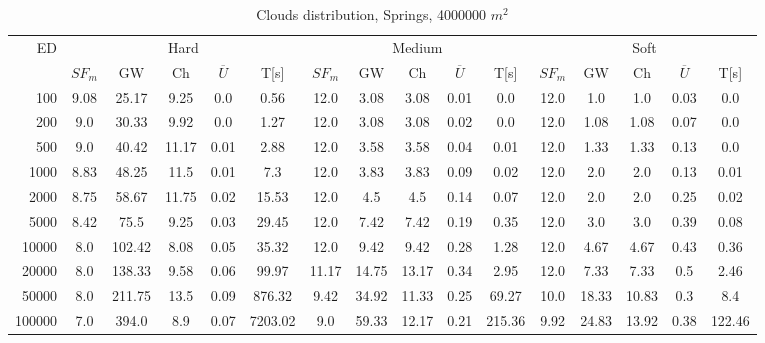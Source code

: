 \begin{table}[htb]
	\centering
	\footnotesize
	\begin{tabular}{|r|c|c|c|c|c|c|c|c|c|c|c|c|c|c|c|} 
		\hline
		\multirow{2}{*}{ED} & \multicolumn{5}{c|}{Hard} & \multicolumn{5}{c|}{Medium} &\multicolumn{5}{c|}{Soft} \\ 
		\cline{2-16} 
		&$SF_{m}$&GW & Ch & $\overline{U}$&T[s] &$SF_{m}$&GW & Ch & $\overline{U}$ &T[s] &$SF_{m}$&GW & Ch & $\overline{U}$  & T[s]  \\ 
		\hline 
		100 & 9.08 & 25.17 & 9.25 & 0.0 & 0.56 & 12.0 & 3.08 & 3.08 & 0.01 & 0.0 & 12.0 & 1.0 & 1.0 & 0.03 & 0.0\\ 
		200 & 9.0 & 30.33 & 9.92 & 0.0 & 1.27 & 12.0 & 3.08 & 3.08 & 0.02 & 0.0 & 12.0 & 1.08 & 1.08 & 0.07 & 0.0\\ 
		500 & 9.0 & 40.42 & 11.17 & 0.01 & 2.88 & 12.0 & 3.58 & 3.58 & 0.04 & 0.01 & 12.0 & 1.33 & 1.33 & 0.13 & 0.0\\ 
		1000 & 8.83 & 48.25 & 11.5 & 0.01 & 7.3 & 12.0 & 3.83 & 3.83 & 0.09 & 0.02 & 12.0 & 2.0 & 2.0 & 0.13 & 0.01\\ 
		2000 & 8.75 & 58.67 & 11.75 & 0.02 & 15.53 & 12.0 & 4.5 & 4.5 & 0.14 & 0.07 & 12.0 & 2.0 & 2.0 & 0.25 & 0.02\\ 
		5000 & 8.42 & 75.5 & 9.25 & 0.03 & 29.45 & 12.0 & 7.42 & 7.42 & 0.19 & 0.35 & 12.0 & 3.0 & 3.0 & 0.39 & 0.08\\ 
		10000 & 8.0 & 102.42 & 8.08 & 0.05 & 35.32 & 12.0 & 9.42 & 9.42 & 0.28 & 1.28 & 12.0 & 4.67 & 4.67 & 0.43 & 0.36\\ 
		20000 & 8.0 & 138.33 & 9.58 & 0.06 & 99.97 & 11.17 & 14.75 & 13.17 & 0.34 & 2.95 & 12.0 & 7.33 & 7.33 & 0.5 & 2.46\\ 
		50000 & 8.0 & 211.75 & 13.5 & 0.09 & 876.32 & 9.42 & 34.92 & 11.33 & 0.25 & 69.27 & 10.0 & 18.33 & 10.83 & 0.3 & 8.4\\ 
		100000 & 7.0 & 394.0 & 8.9 & 0.07 & 7203.02 & 9.0 & 59.33 & 12.17 & 0.21 & 215.36 & 9.92 & 24.83 & 13.92 & 0.38 & 122.46\\ 
		\hline 
	\end{tabular} 
	\caption{Clouds distribution, Springs, 4000000 $m^2$} 
	\label{tab:UnSprings2000} 
\end{table} 
